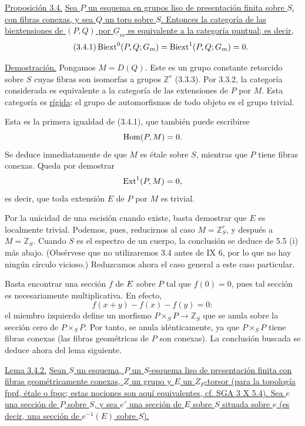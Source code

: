\par\medskip
\noindent\underline{Proposición 3.4.} \underline{Sea $P$ un esquema
en grupos liso de presentación finita sobre $S$, con fibras conexas,
y sea $Q$ un toro sobre $S$. Entonces la categoría de las
biextensiones de $(P,Q)$ por $\underline G_m$ es equivalente a la
categoría puntual; es decir,}
\begin{equation}\tag{3.4.1}
 \Biext^0(P,Q;\underline G_m)=
 \Biext^1(P,Q;\underline G_m)=0.
\end{equation}

\noindent\underline{Demostración.} Pongamos $M=D(Q)$. Este es un grupo
constante retorcido sobre $S$ cuyas fibras son isomorfas a grupos
$\mathbb Z^r$ (3.3.3). Por 3.3.2, la categoría considerada es
equivalente a la categoría de las extensiones de $P$ por $M$. Esta
categoría es \underline{rígida}: el grupo de automorfismos de todo
objeto es el grupo trivial.


Esta es la primera igualdad de (3.4.1), que también puede escribirse
\[
 \Hom(P,M)=0.
\]
Se deduce inmediatamente de que $M$ es étale sobre $S$, mientras que
$P$ tiene fibras conexas. Queda por demostrar
\[
 \Ext^1(P,M)=0,
\]
es decir, que toda extensión $E$ de $P$ por $M$ es trivial.

Por la unicidad de una escisión cuando existe, basta demostrar que $E$
es localmente trivial. Podemos, pues, reducirnos al caso
$M=\mathbb Z_S^r$, y después a $M=\mathbb Z_S$. Cuando $S$ es el
espectro de un cuerpo, la conclusión se deduce de 5.5 (i) más abajo.
(Obsérvese que no utilizaremos 3.4 antes de IX 6, por lo que no hay
ningún círculo vicioso.) Reduzcamos ahora el caso general a este caso
particular.

Basta encontrar una sección $f$ de $\sisi{P}{E}$ sobre $P$ tal que
$f(0)=0$, pues tal sección es necesariamente multiplicativa. En efecto,
\[
 f(x+y)-f(x)-f(y)=0:
\]
el miembro izquierdo define un morfismo
$P\times_S P\longrightarrow\mathbb Z_S$ que se anula sobre la sección
cero de $P\times_S P$. Por tanto, se anula idénticamente, ya que
$P\times_S P$ tiene fibras conexas (las fibras geométricas de $P$ son
conexas). La conclusión buscada se deduce ahora del lema siguiente.

\medskip
\noindent\underline{Lema 3.4.2.} \underline{Sean $S$ un esquema, $P$
un $S$-esquema liso de presentación finita con fibras geométricamente
conexas, $Z$ un grupo y $E$ un $Z_P$-torsor (para la topología fppf,
étale o fpqc; estas nociones son aquí equivalentes, cf. SGA 3 X 5.4).
Sea $e$ una sección de $P$ sobre $S$, y sea $e'$ una sección de $E$
sobre $S$ situada sobre $e$ (es decir, una sección de $e^{-1}(E)$
sobre $S$).}

